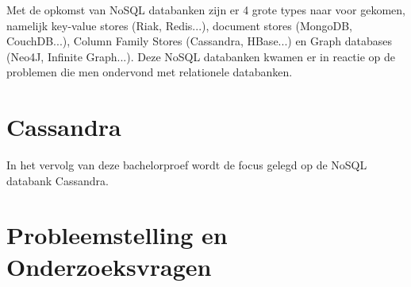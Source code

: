 Met de opkomst van NoSQL databanken zijn er 4 grote types naar voor gekomen, namelijk key-value stores (Riak, Redis...), document stores (MongoDB, CouchDB...), Column Family Stores (Cassandra, HBase...) en Graph databases (Neo4J, Infinite Graph...). 
Deze NoSQL databanken kwamen er in reactie op de problemen die men ondervond met relationele databanken. 

\section{Cassandra}

In het vervolg van deze bachelorproef wordt de focus gelegd op de NoSQL databank Cassandra.


\section{Probleemstelling en Onderzoeksvragen}
\label{sec:onderzoeksvragen}

